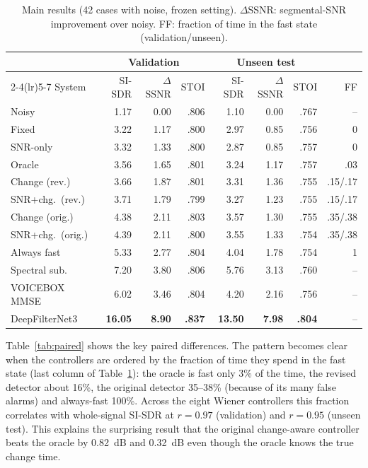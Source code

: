 \documentclass[10pt,conference,a4paper]{IEEEtran}
\newcommand{\sig}[1]{\textbf{#1}}
\begin{document}
\begin{table}[t]
\centering
\caption{Main results (42 cases with noise, frozen setting). $\Delta$SSNR:
segmental-SNR improvement over noisy. FF: fraction of time in the fast state
(validation/unseen).}
\label{tab:main}
\small
\setlength{\tabcolsep}{6pt}
\begin{tabular}{@{}lrrrrrrr@{}}
\toprule
& \multicolumn{3}{c}{Validation} & \multicolumn{3}{c}{Unseen test} & \\
\cmidrule(lr){2-4}\cmidrule(lr){5-7}
System & SI-SDR & $\Delta$SSNR & STOI & SI-SDR & $\Delta$SSNR & STOI & FF\\
\midrule
Noisy & 1.17 & 0.00 & .806 & 1.10 & 0.00 & .767 & --\\
Fixed & 3.22 & 1.17 & .800 & 2.97 & 0.85 & .756 & 0\\
SNR-only & 3.32 & 1.33 & .800 & 2.87 & 0.85 & .757 & 0\\
Oracle & 3.56 & 1.65 & .801 & 3.24 & 1.17 & .757 & .03\\
Change (rev.) & 3.66 & 1.87 & .801 & 3.31 & 1.36 & .755 & .15/.17\\
SNR+chg.\ (rev.) & 3.71 & 1.79 & .799 & 3.27 & 1.23 & .755 & .15/.17\\
Change (orig.) & 4.38 & 2.11 & .803 & 3.57 & 1.30 & .755 & .35/.38\\
SNR+chg.\ (orig.) & 4.39 & 2.11 & .800 & 3.55 & 1.33 & .754 & .35/.38\\
Always fast & 5.33 & 2.77 & .804 & 4.04 & 1.78 & .754 & 1\\
\midrule
Spectral sub. & 7.20 & 3.80 & .806 & 5.76 & 3.13 & .760 & --\\
VOICEBOX MMSE & 6.02 & 3.46 & .804 & 4.20 & 2.16 & .756 & --\\
DeepFilterNet3 & \sig{16.05} & \sig{8.90} & \sig{.837} & \sig{13.50} & \sig{7.98} & \sig{.804} & --\\
\bottomrule
\end{tabular}
\end{table}

Table~\ref{tab:paired} shows the key paired differences. The pattern becomes
clear when the controllers are ordered by the fraction of time they spend in the
fast state (last column of Table~\ref{tab:main}): the oracle is fast only 3\% of
the time, the revised detector about 16\%, the original detector 35--38\%
(because of its many false alarms) and always-fast 100\%. Across the eight
Wiener controllers this fraction correlates with whole-signal SI-SDR at $r=0.97$
(validation) and $r=0.95$ (unseen test). This explains the surprising result that
the original change-aware controller beats the oracle by 0.82~dB and 0.32~dB even
though the oracle knows the true change time.
\end{document}

